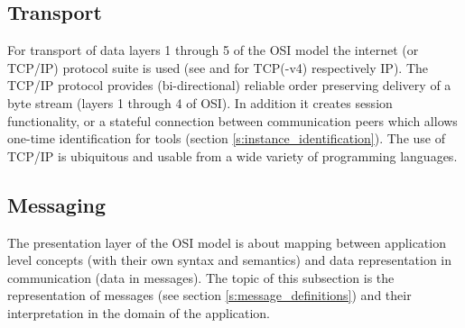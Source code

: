 \documentclass{article}
\begin{document}
  \subsection{Transport} \label{ss:transport}

   For transport of data layers 1 through 5 of the OSI model the internet (or
   TCP/IP) protocol suite is used (see \cite{rfc793} and \cite{rfc791} for
   TCP(-v4) respectively IP). The TCP/IP protocol provides (bi-directional)
   reliable order preserving delivery of a byte stream (layers 1 through 4 of
   OSI). In addition it creates session functionality, or a stateful connection
   between communication peers which allows one-time identification for tools
   (section \ref{s:instance_identification}).  The use of TCP/IP is ubiquitous
   and usable from a wide variety of programming languages.



  \subsection{Messaging}

   The presentation layer of the OSI model is about mapping between application
   level concepts (with their own syntax and semantics) and data representation
   in communication (data in messages). The topic of this subsection is the
   representation of messages (see section \ref{s:message_definitions}) and
   their interpretation in the domain of the application.
   
\end{document}
